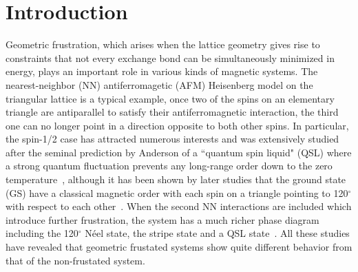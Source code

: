 \documentclass[aps,prb,reprint,amsfonts,amsmath,amssymb,showpacs,groupedaddress,superscriptaddress]{revtex4-1}
\begin{document}
\maketitle

\section{\label{sec:Introduction}Introduction}

Geometric frustration, which arises when the lattice geometry gives rise to constraints that not every exchange bond can be simultaneously minimized in energy, plays an important role in various kinds of magnetic systems. The nearest-neighbor (NN) antiferromagetic (AFM) Heisenberg model on the triangular lattice is a typical example, once two of the spins on an elementary triangle are antiparallel to satisfy their antiferromagnetic interaction, the third one can no longer point in a direction opposite to both other spins. In particular, the spin-1/2 case has attracted numerous interests and was extensively studied after the seminal prediction by Anderson of a ``quantum spin liquid" (QSL) where a strong quantum fluctuation prevents any long-range order down to the zero temperature~\cite{Anderson1973}, although it has been shown by later studies that the ground state (GS) have a classical magnetic order with each spin on a triangle pointing to 120$^\circ$ with respect to each other~\cite{PhysRevLett.99.127004,PhysRevLett.82.3899,PhysRevB.50.10048,PhysRevLett.60.2531}. When the second NN interactions are included which introduce further frustration, the system has a much richer phase diagram including the 120$^\circ$ N\'{e}el state, the stripe state and a QSL state~\cite{PhysRevB.91.014426,PhysRevB.92.041105,PhysRevB.92.140403,PhysRevB.96.165141,PhysRevB.93.144411,JPSJ.83.093707,PhysRevB.96.075116,PhysRevB.94.121111,PhysRevLett.123.207203}. All these studies have revealed that geometric frustated systems show quite different behavior from that of the non-frustated system.
\end{document}
